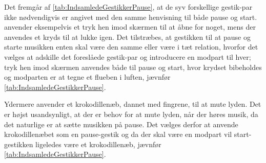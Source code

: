 \noindent
%
Det fremgår af \autoref{tab:IndsamledeGestikkerPause}, at de syv forskellige gestik-par ikke nødvendigvis er angivet med den samme henvisning til både pause og start. \textcite[s. 48]{PDF:UserDefinedGesturesTV} anvender eksempelvis et tryk hen imod skærmen til at åbne for noget, mens der anvendes et kryds til at lukke igen. Det tilstræbes, at gestikken til at pause og starte musikken enten skal være den samme eller være i tæt relation, hvorfor det vælges at adskille det foreslåede gestik-par og introducere en modpart til hver; tryk hen imod skærmen anvendes både til pause og start, hvor krydset bibeholdes og modparten er at tegne et flueben i luften, jævnfør \autoref{tab:IndsamledeGestikkerPause}.   

Ydermere anvender \textcite[s. 48]{PDF:UserDefinedGesturesTV} et krokodillenæb, dannet med fingrene, til at mute lyden. Det er højst usandsynligt, at der er behov for at mute lyden, når der høres musik, da det naturlige er at sætte musikken på pause. Det vælges derfor at anvende krokodillenæbet som en pause-gestik og da der skal være en modpart vil start-gestikken ligeledes være et krokodillenæb, jævnfør \autoref{tab:IndsamledeGestikkerPause}. 
\newpage
%
